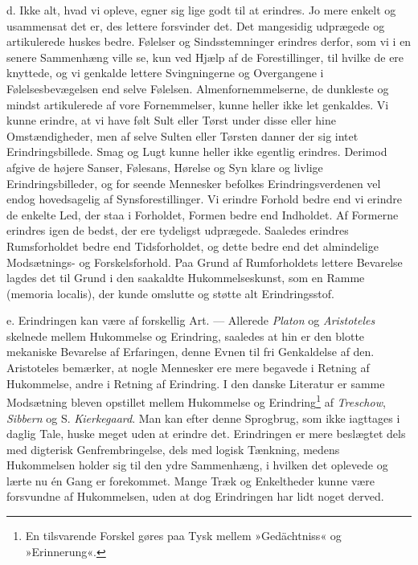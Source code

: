 \documentclass[12pt,a4paper,openany]{book}
\newcommand{\opage}[1]{\marginnote{\footnotesize\textit{[#1]}}}
\begin{document}
d. Ikke alt, hvad vi opleve, egner sig lige godt til at erindres. Jo
mere enkelt og usammensat det er, des lettere forsvinder det. Det
mangesidig udprægede og artikulerede huskes bedre. Følelser og
Sindsstemninger erindres derfor, som vi i en senere Sammenhæng ville se,
kun ved Hjælp af de Forestillinger, til hvilke de ere knyttede, og vi
genkalde lettere Svingningerne og Overgangene i Følelsesbevægelsen end
selve Følelsen. Almenfornemmelserne, de dunkleste og mindst artikulerede
af vore Fornemmelser, kunne heller ikke let genkaldes. Vi kunne erindre,
at vi have følt Sult eller Tørst under disse eller hine Omstændigheder,
men af selve Sulten eller Tørsten danner der sig intet
Erindringsbillede. Smag og Lugt kunne heller ikke egentlig erindres.
Derimod afgive de højere Sanser, Følesans, Hørelse og Syn klare og
livlige Erindringsbilleder, og for seende Mennesker befolkes
Erindringsverdenen vel endog hovedsagelig af Synsforestillinger. Vi
erindre Forhold bedre end vi erindre de enkelte Led, der staa i
Forholdet, Formen bedre end Indholdet. Af Formerne erindres igen de
bedst, der ere tydeligst udprægede. Saaledes erindres Rumsforholdet
bedre end Tidsforholdet, og dette bedre end det almindelige Modsætnings-
og Forskelsforhold. Paa Grund af Rumforholdets lettere Bevarelse lagdes
det til Grund i den saakaldte Hukommelseskunst, som en Ramme (memoria
localis), der kunde omslutte og støtte alt Erindringsstof.


\opage{184}e. Erindringen kan være af forskellig Art. --- Allerede
\emph{Platon} og \emph{Aristoteles} skelnede mellem Hukommelse og
Erindring, saaledes at hin er den blotte mekaniske Bevarelse af
Erfaringen, denne Evnen til fri Genkaldelse af den. Aristoteles
bemærker, at nogle Mennesker ere mere begavede i Retning af Hukommelse,
andre i Retning af Erindring. I den danske Literatur er samme Modsætning
bleven opstillet mellem Hukommelse og Erindring\footnote[1]{En
tilsvarende Forskel gøres paa Tysk mellem »Gedächtniss« og
»Erinnerung«.} af \emph{Treschow}, \emph{Sibbern} og S.
\emph{Kierkegaard}. Man kan efter denne Sprogbrug, som ikke iagttages i
daglig Tale, huske meget uden at erindre det. Erindringen er mere
beslægtet dels med digterisk Genfrembringelse, dels med logisk Tænkning,
medens Hukommelsen holder sig til den ydre Sammenhæng, i hvilken det
oplevede og lærte nu én Gang er forekommet. Mange Træk og Enkeltheder
kunne være forsvundne af Hukommelsen, uden at dog Erindringen har lidt
noget derved.
\end{document}
